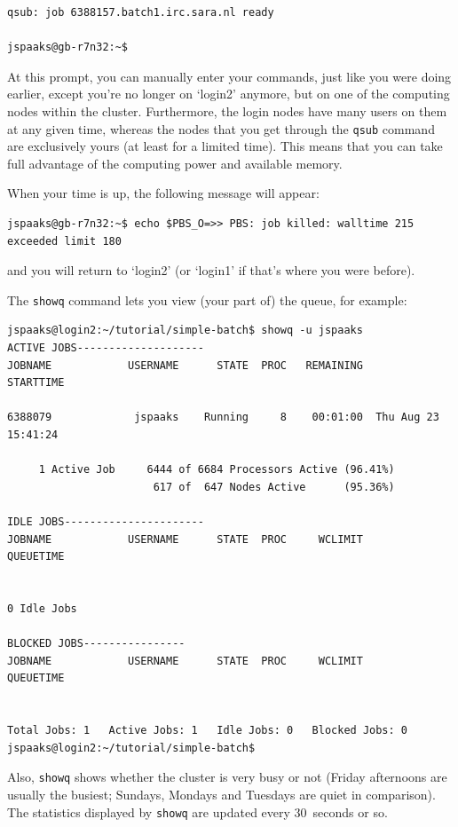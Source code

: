 \begin{lstlisting}[style=basic,style=bash]
qsub: job 6388157.batch1.irc.sara.nl ready

jspaaks@gb-r7n32:~$
\end{lstlisting}
At this prompt, you can manually enter your commands, just like you were doing earlier, except you're no longer on `login2' anymore, but on one of the computing nodes within the cluster. Furthermore, the login nodes have many users on them at any given time, whereas the nodes that you get through the \texttt{qsub} command are exclusively yours (at least for a limited time). This means that you can take full advantage of the computing power and available memory.

When your time is up, the following message will appear:
\begin{lstlisting}[style=basic,style=bash]
jspaaks@gb-r7n32:~$ echo $PBS_O=>> PBS: job killed: walltime 215 exceeded limit 180
\end{lstlisting}
and you will return to `login2' (or `login1' if that's where you were before).

The \lstinline[style=bashinline]{showq} command lets you view (your part of) the queue, for example:
\begin{lstlisting}[style=basic,style=bash]
jspaaks@login2:~/tutorial/simple-batch$ showq -u jspaaks
ACTIVE JOBS--------------------
JOBNAME            USERNAME      STATE  PROC   REMAINING            STARTTIME

6388079             jspaaks    Running     8    00:01:00  Thu Aug 23 15:41:24

     1 Active Job     6444 of 6684 Processors Active (96.41%)
                       617 of  647 Nodes Active      (95.36%)

IDLE JOBS----------------------
JOBNAME            USERNAME      STATE  PROC     WCLIMIT            QUEUETIME


0 Idle Jobs

BLOCKED JOBS----------------
JOBNAME            USERNAME      STATE  PROC     WCLIMIT            QUEUETIME


Total Jobs: 1   Active Jobs: 1   Idle Jobs: 0   Blocked Jobs: 0
jspaaks@login2:~/tutorial/simple-batch$
\end{lstlisting}
Also, \lstinline[style=bashinline]{showq} shows whether the cluster is very busy or not (Friday afternoons are usually the busiest; Sundays, Mondays and Tuesdays are quiet in comparison). The statistics displayed by \lstinline[style=bashinline]{showq} are updated every 30~seconds or so.


